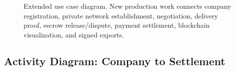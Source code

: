 \documentclass[11pt]{article}
\begin{document}
\begin{figure}[H]
{%
}
\caption{Extended use case diagram. New production work connects company registration, private network establishment, negotiation, delivery proof, escrow release/dispute, payment settlement, blockchain visualization, and signed exports.}
\label{fig:usecase}
\end{figure}



\subsection{Activity Diagram: Company to Settlement}
\end{document}
